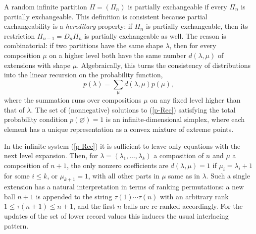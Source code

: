 \documentclass{article}
\begin{document}
A random infinite partition $\Pi=(\Pi_n)$ is partially exchangeable if every
$\Pi_n$ is partially exchangeable.
This definition is consistent because partial exchangeability is a
{\it hereditary} property: if $\Pi_n$ is partially exchangeable, then its
restriction $\Pi_{n-1}=D_n\Pi_n$ is partially exchangeable as well.
The reason is combinatorial: if two partitions have the same shape $\lambda$,
then for every composition $\mu$ on a higher level both have the same number
$d(\lambda,\mu)$ of extensions with shape $\mu$.
Algebraically, this turns the consistency of distributions into the linear
recursion on the probability function,
\begin{equation}\label{p-Rec}
p(\lambda)=\sum_\mu d(\lambda,\mu)p(\mu),
\end{equation}
where the summation runs over compositions $\mu$ on any fixed level higher
than that of $\lambda$.
The set of (nonnegative) solutions to (\ref{p-Rec}) satisfying the 
 total probability condition $p(\varnothing)=1$ is an infinite-dimensional simplex,
where each element has a unique representation as a convex mixture of extreme points.

In the infinite system (\ref{p-Rec}) it is sufficient to leave only equations with the next level expansion.
Then, for $\lambda=(\lambda_1,\ldots,\lambda_k)$ a composition of $n$ and $\mu$ a
composition of $n+1$, the only nonzero coefficients are $d(\lambda,\mu)=1$
if $\mu_i=\lambda_i+1$ for some $i\le k$, or $\mu_{k+1}=1$, with all other
parts in $\mu$ same as in $\lambda$.
Such a single extension has a natural interpretation in terms of ranking permutations:
a new ball $n+1$ is appended to the string $\tau(1)\cdots\tau(n)$ with an arbitrary rank 
$1\leq\tau(n+1)\leq n+1$, and the
first $n$ balls are re-ranked accordingly. For the updates of the set of lower record values
this induces the usual interlacing pattern.
\end{document}
